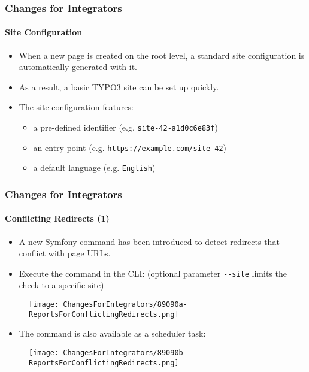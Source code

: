 
\begin{frame}[fragile]
	\frametitle{Changes for Integrators}
	\framesubtitle{Site Configuration}

	\begin{itemize}
		\item When a new page is created on the root level, a standard site
			configuration is automatically generated with it.
		\item As a result, a basic TYPO3 site can be set up quickly.
		\item The site configuration features:

			\begin{itemize}
				\item a pre-defined identifier (e.g. \texttt{site-42-a1d0c6e83f})
				\item an entry point (e.g. \texttt{https://example.com/site-42})
				\item a default language (e.g. \texttt{English})
			\end{itemize}

	\end{itemize}

\end{frame}


\begin{frame}[fragile]
	\frametitle{Changes for Integrators}
	\framesubtitle{Conflicting Redirects (1)}

	\begin{itemize}
		\item A new Symfony command has been introduced to detect redirects
			that conflict with page URLs.
		\item Execute the command in the CLI:\newline
			\smaller
				(optional parameter \texttt{-}\texttt{-site} limits the check to a specific site)
			\normalsize
	\end{itemize}

	\begin{figure}
		\texttt{[image: ChangesForIntegrators/89090a-ReportsForConflictingRedirects.png]}
	\end{figure}

	\begin{itemize}
		\item The command is also available as a scheduler task:
	\end{itemize}

	\begin{figure}
		\texttt{[image: ChangesForIntegrators/89090b-ReportsForConflictingRedirects.png]}
	\end{figure}

\end{frame}

